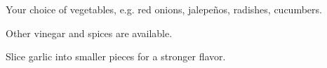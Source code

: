 \begin{variation}
\item Your choice of vegetables, e.g. red onions, jalepe\~{n}os, radishes, cucumbers.
\item Other vinegar and spices are available.
\item Slice garlic into smaller pieces for a stronger flavor.
\end{variation}


\recipeend

